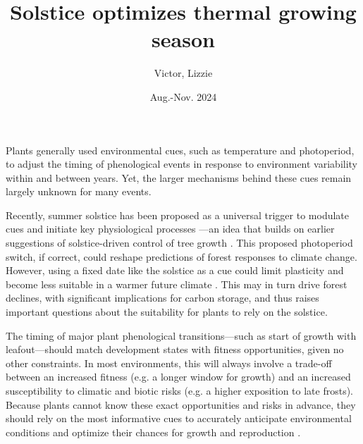 \documentclass[11pt,letter]{article}
\title{Solstice optimizes thermal growing season}
\author{Victor, Lizzie}
\date{Aug.-Nov. 2024}
\begin{document}
\maketitle


Plants generally used environmental cues, such as temperature and photoperiod, to adjust the timing of phenological events in response to environment variability within and between years. Yet, the larger mechanisms behind these cues remain largely unknown for many events. 

Recently, summer solstice has been proposed as a universal trigger to modulate cues and initiate key physiological processes \citep{Zohner2023, Journe2024}---an idea that builds on earlier suggestions of solstice-driven control of tree growth \citep{Rossi2006}. This proposed photoperiod switch, if correct, could reshape predictions of forest responses to climate change. 
However, using a fixed date like the solstice as a cue could limit plasticity and become less suitable in a warmer future climate \citep{Wolkovich2021}. 
This may in turn drive forest declines, with significant implications for carbon storage, and thus raises important questions about the suitability for plants to rely on the solstice. 

The timing of major plant phenological transitions---such as start of growth with leafout---should match development states with fitness opportunities, given no other constraints. In most environments, this will always involve a trade-off between an increased fitness (e.g. a longer window for growth) and an increased susceptibility to climatic and biotic risks (e.g. a higher exposition to late frosts). Because plants cannot know these exact opportunities and risks in advance, they should rely on the most informative cues to accurately anticipate environmental conditions and optimize their chances for growth and reproduction \citep{Chevin2015, Bonamour2019}.
\end{document}
